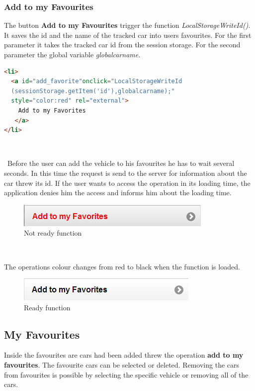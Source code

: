 \subsubsection{Add to my Favourites}
The button \textbf{Add to my Favourites} trigger the function \textit{LocalStorageWriteId()}. It saves the id and the name of the tracked car into users favourites. For the first parameter it takes the tracked car id from the session storage. For the second parameter the global variable \textit{globalcarname}.
\\

\begin{lstlisting}[language=html, caption= 
add favourite sorce code,captionpos=b]
<li>
  <a id="add_favorite"onclick="LocalStorageWriteId
  (sessionStorage.getItem('id'),globalcarname);"
  style="color:red" rel="external">
    Add to my Favorites
   </a>
</li>
\end{lstlisting}
\

\
Before the user can add the vehicle to his favourites he has to wait several seconds. In this time the request is send to the server for information about the car threw its id. If the user wants to access the operation in its loading time, the application denies him the access and informs him about the loading time.
\\

\begin{figure}[h]
\centering
\includegraphics[width=0.65\linewidth]{graphics/chapter4/11}
\caption{Not ready function}
\end{figure}
\

The operations colour changes from red to black when the function is loaded.
\\
\begin{figure}[h]
\centering
\includegraphics[width=0.65\linewidth]{graphics/chapter4/12}
\caption{Ready function}
\end{figure}
\newpage

\subsection{My Favourites}
Inside the favourites are cars had been added threw the operation \textbf{add to my favourites}. The favourite cars can be selected or deleted. Removing the cars from favourites is possible by selecting the specific vehicle or removing all of the cars.
\\

